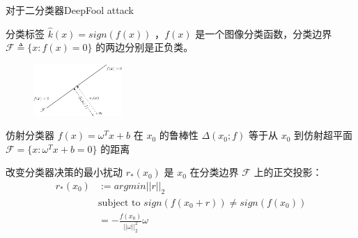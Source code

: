 \begin{frame}{对于二分类器DeepFool attack}
    \begin{multicols}{2}
        分类标签 $\hat{k}(x)=sign(f(x))$ ，$f(x)$ 是一个图像分类函数，分类边界 $\mathscr{F}\triangleq\{x:f(x)=0\}$ 的两边分别是正负类。
        \begin{figure}
            \centering
            \includegraphics[width=0.3\textwidth]{docs/paperReading/deepfool/deepfool-adv_example_in_linear_classifier.png}
        \end{figure}

        仿射分类器 $f(x)=\omega^T x+b$ 在 $x_0$ 的鲁棒性 $\Delta(x_0;f)$ 等于从 $x_0$ 到仿射超平面 $\mathscr{F}=\{x:\omega^T x+b=0\}$ 的距离

        改变分类器决策的最小扰动 $r_*(x_0)$ 是 $x_0$ 在分类边界 
        $\mathscr{F}$ 上的正交投影：
        \begin{equation}
            \begin{aligned}
                r_*(x_0)    &:=argmin ||r||_2 \\
                            &\text{subject to } sign(f(x_0+r))\neq sign(f(x_0)) \\
                            &=-\frac{f(x_0)}{||\omega||_2^2}\omega
            \end{aligned}
        \end{equation}
    \end{multicols}
\end{frame}

